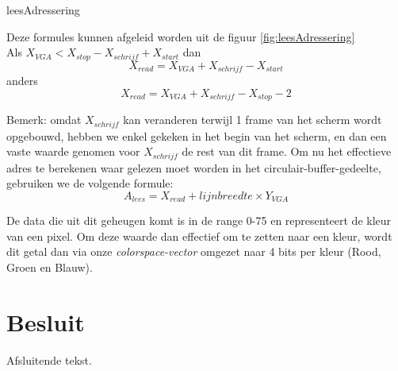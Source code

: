 \documentclass[a4paper,kul]{kulakarticle} %
\begin{document}
\begin{itemize}
leesAdressering

	Deze formules kunnen afgeleid worden uit de figuur \ref{fig:leesAdressering}
	\\
	
	Als $X_{VGA} < X_{stop} - X_{schrijf} + X_{start}$ dan 
	$$X_{read} = X_{VGA} + X_{schrijf} - X_{start}$$
	anders
	$$X_{read} = X_{VGA} + X_{schrijf} - X_{stop} - 2$$
	
	
	Bemerk: omdat $X_{schrijf}$ kan veranderen terwijl 1 frame van het scherm wordt opgebouwd, hebben we enkel gekeken in het begin van het scherm, en dan een vaste waarde genomen voor $X_{schrijf}$ de rest van dit frame. Om nu het effectieve adres te berekenen waar gelezen moet worden in het circulair-buffer-gedeelte, gebruiken we de volgende formule:
	$$ A_{lees} = X_{read} + lijnbreedte \times Y_{VGA} $$
	
	De data die uit dit geheugen komt is in de range 0-75 en representeert de kleur van een pixel. Om deze waarde dan effectief om te zetten naar een kleur, wordt dit getal dan via onze \textit{colorspace-vector} omgezet naar 4 bits per kleur (Rood, Groen en Blauw).

\end{itemize}

\section{Besluit}

Afsluitende tekst.
\end{document}
